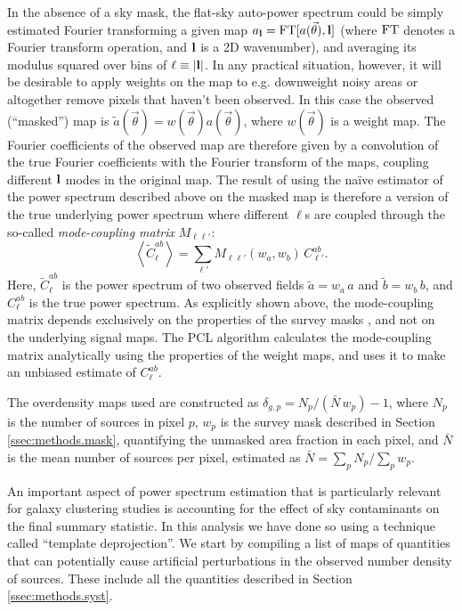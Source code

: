 \documentclass[a4paper,11pt]{article}
\newcommand{\nv}{\vec{\theta}}
\begin{document}
    In the absence of a sky mask, the flat-sky auto-power spectrum could be simply estimated Fourier transforming a given map $a_{\bf l}={\rm FT}[a(\nv),{\bf l}]$ (where ${\rm FT}$ denotes a Fourier transform operation, and ${\bf l}$ is a 2D wavenumber), and averaging its modulus squared over bins of $\ell\equiv|{\bf l}|$. In any practical situation, however, it will be desirable to apply weights on the map to e.g. downweight noisy areas or altogether remove pixels that haven't been observed. In this case the observed (``masked'') map is $\tilde{a}(\nv)=w(\nv)a(\nv)$, where $w(\nv)$ is a weight map. The Fourier coefficients of the observed map are therefore given by a convolution of the true Fourier coefficients with the Fourier transform of the maps, coupling different ${\bf l}$ modes in the original map. The result of using the na\"ive estimator of the power spectrum described above on the masked map is therefore a version of the true underlying power spectrum where different $\ell$s are coupled through the so-called {\sl mode-coupling matrix} $M_{\ell\ell'}$:
    \begin{equation}
      \left\langle \tilde{C}^{ab}_\ell \right\rangle = \sum_{\ell'} M_{\ell\ell'}(w_a,w_b)\,C^{ab}_{\ell'}.
    \end{equation}
    Here, $\tilde{C}^{ab}_\ell$ is the power spectrum of two observed fields $\tilde{a}=w_a\,a$ and $\tilde{b}=w_b\,b$, and $C^{ab}_\ell$ is the true power spectrum. As explicitly shown above, the mode-coupling matrix depends exclusively on the properties of the survey masks \citep{2002ApJ...567....2H}, and not on the underlying signal maps. The PCL algorithm calculates the mode-coupling matrix analytically using the properties of the weight maps, and uses it to make an unbiased estimate of $C^{ab}_\ell$.
    
    The overdensity maps used are constructed as $\delta_{g,p}=N_p/(\bar{N}\,w_p)-1$, where $N_p$ is the number of sources in pixel $p$, $w_p$ is the survey mask described in Section \ref{ssec:methods.mask}, quantifying the unmasked area fraction in each pixel, and $\bar{N}$ is the mean number of sources per pixel, estimated as $\bar{N}=\sum_p N_p/\sum_p w_p$.
    
    An important aspect of power spectrum estimation that is particularly relevant for galaxy clustering studies is accounting for the effect of sky contaminants on the final summary statistic. In this analysis we have done so using a technique called ``template deprojection''. We start by compiling a list of maps of quantities that can potentially cause artificial perturbations in the observed number density of sources. These include all the quantities described in Section \ref{ssec:methods.syst}.
    
\end{document}
